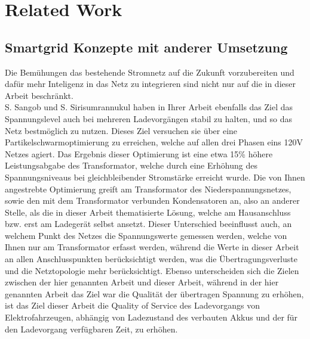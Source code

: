\chapter{Related Work}

\section{Smartgrid Konzepte mit anderer Umsetzung}
Die Bemühungen das bestehende Stromnetz auf die Zukunft vorzubereiten und dafür mehr Inteligenz in das Netz zu integrieren sind nicht nur auf die in dieser Arbeit beschränkt. \\
S. Sangob und S. Sirisumrannukul \citet{RW_1_1} haben in Ihrer Arbeit ebenfalls das Ziel das Spannungslevel auch bei mehreren Ladevorgängen stabil zu halten, und so das Netz bestmöglich zu nutzen. Dieses Ziel versuchen sie über eine Partikelschwarmoptimierung zu erreichen, welche auf allen drei Phasen eins 120V Netzes agiert. Das Ergebnis dieser Optimierung ist eine etwa 15\% höhere Leistungsabgabe des Transformator, welche durch eine Erhöhung des Spannungsniveaus bei gleichbleibender Stromstärke erreicht wurde. Die von Ihnen angestrebte Optimierung greift  am Transformator des Niederspannungsnetzes, sowie den mit dem Transformator verbunden Kondensatoren an, also an anderer Stelle, als die in dieser Arbeit thematisierte Lösung, welche am Hausanschluss bzw. erst am Ladegerät selbst ansetzt. Dieser Unterschied beeinflusst auch, an welchem Punkt des Netzes die Spannungswerte gemessen werden, welche von Ihnen nur am Transformator erfasst werden, während die Werte in dieser Arbeit an allen Anschlusspunkten berücksichtigt werden, was die Übertragungsverluste und die Netztopologie mehr berücksichtigt. Ebenso unterscheiden sich die Zielen zwischen der hier genannten Arbeit und dieser Arbeit, während in der hier genannten Arbeit das Ziel war die Qualität der übertragen Spannung zu erhöhen, ist das Ziel dieser Arbeit die Quality of Service des Ladevorgangs von Elektrofahrzeugen, abhängig von Ladezustand des verbauten Akkus und der für den Ladevorgang verfügbaren Zeit, zu erhöhen.
\\
